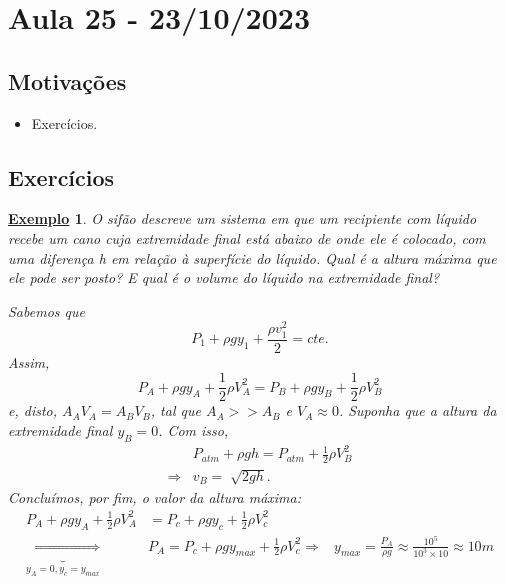\documentclass{article}
\newtheorem{example}{\underline{Exemplo}}
\begin{document}
\newpage

\section{Aula 25 - 23/10/2023}
\subsection{Motivações}
\begin{itemize}
 \item Exercícios.
\end{itemize}
\subsection{Exercícios}
\begin{example}
 O sifão descreve um sistema em que um recipiente com líquido recebe um cano cuja extremidade final está abaixo de onde ele é colocado, com uma diferença h
em relação à superfície do líquido. Qual é a altura máxima que ele pode ser posto? E qual é o volume do líquido na extremidade final?

 Sabemos que 
   \[
     P_{1} + \rho gy_{1} + \frac{\rho v_{1}^{2}}{2} = cte.
   \]
 Assim, 
   \[
     P_{A} + \rho gy_{A} + \frac{1}{2}\rho V_{A}^{2} = P_{B} + \rho gy_{B} + \frac{1}{2}\rho V_{B}^{2}
   \]
 e, disto, \(A_{A}V_{A} = A_{B}V_{B}\), tal que \(A_{A} >> A_{B}\) e \(V_{A}\approx 0\). Suponha que a altura da extremidade final \(y_{B} = 0\). Com isso, 
\begin{align*}
  &P_{atm} + \rho gh = P_{atm} + \frac{1}{2}\rho V_{B}^{2}\\
  \Rightarrow& v_{B} = \sqrt[]{2gh}.
\end{align*}
 Concluímos, por fim, o valor da altura máxima:
\begin{align*}
  P_{A} + \rho gy_{A} + \frac{1}{2}\rho V_{A}^{2} &= P_{c} + \rho gy_{c} + \frac{1}{2}\rho V_{c}^{2}\\
  \underbrace{\Rightarrow}_{y_{A}=0, y_{c} = y_{max}} & P_{A} = P_{c} + \rho gy_{max} + \frac{1}{2}\rho V_{c}^{2}
                                         \Rightarrow  & y_{max} = \frac{P_{A}}{\rho g} \approx \frac{10^{5}}{10^{3}\times 10} \approx 10m
\end{align*}
\end{example}
\end{document}
